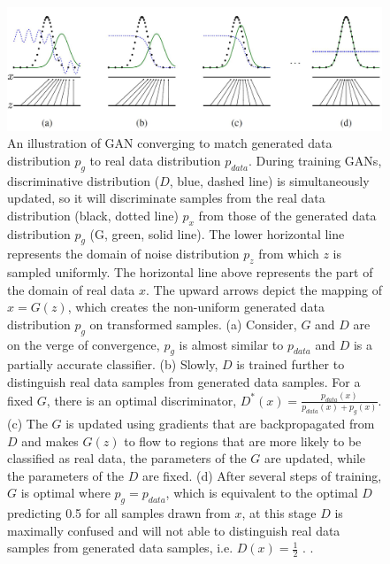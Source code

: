 \begin{figure}[H]
        \begin{center}
	    \includegraphics[scale=0.49]{images/Fundamentals/GANTraining.jpg}
	    \caption[An illustration of \ac{GAN} converging to match generated data distribution $p_g$ to real data distribution $p_{data}$.]{An illustration of \ac{GAN} converging to match generated data distribution $p_g$ to real data distribution $p_{data}$. During training \acp{GAN}, discriminative distribution ($D$, blue, dashed line) is simultaneously updated, so it will discriminate samples from the real data distribution (black, dotted line) $p_x$ from those of the generated data distribution $p_g$ (G, green, solid line). The lower horizontal line represents the domain of noise distribution $p_z$ from which $z$ is sampled uniformly. The horizontal line above represents the part of the domain of real data $x$. The upward arrows depict the mapping of $x = G(z)$, which creates the non-uniform generated data distribution $p_g$ on transformed samples. (a) Consider, $G$ and $D$ are on the verge of convergence, $p_g$ is almost similar to $p_{data}$ and $D$ is a partially accurate classifier. (b) Slowly, $D$ is trained further to distinguish real data samples from generated data samples. For a fixed $G$, there is an optimal discriminator, $D^*(x) = \frac{p_{data}(x)}{p_{data}(x) + p_g(x)}$. (c) The $G$ is updated using gradients that are backpropagated from $D$ and makes $G(z)$ to flow to regions that are more likely to be classified as real data, the parameters of the $G$ are updated, while the parameters of the $D$ are fixed. (d) After several steps of training, $G$ is optimal where $p_g = p_{data}$, which is equivalent to the optimal $D$ predicting 0.5 for all samples drawn from $x$, at this stage $D$ is maximally confused and will not able to distinguish real data samples from generated data samples, i.e. $D(x) = \frac{1}{2}$ \cite{goodfellow2014generative}. .}
	    \label{fig:GANTraining}
	    \end{center}
\end{figure}

